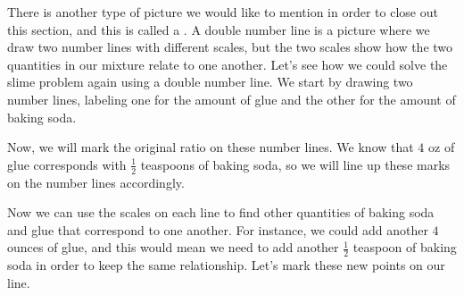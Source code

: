 \documentclass{ximera}
\begin{document}
There is another type of picture we would like to mention in order to close out this section, and this is called a . A double number line is a picture where we draw two number lines with different scales, but the two scales show how the two quantities in our mixture relate to one another. Let's see how we could solve the slime problem again using a double number line. We start by drawing two number lines, labeling one for the amount of glue and the other for the amount of baking soda.

\begin{image}
\end{image}

Now, we will mark the original ratio on these number lines. We know that $4$ oz of glue corresponds with $\frac{1}{2}$ teaspoons of baking soda, so we will line up these marks on the number lines accordingly. 

\begin{image}
\end{image}

Now we can use the scales on each line to find other quantities of baking soda and glue that correspond to one another. For instance, we could add another $4$ ounces of glue, and this would mean we need to add another $\frac{1}{2}$ teaspoon of baking soda in order to keep the same relationship. Let's mark these new points on our line.

\begin{image}
\end{image}
\end{document}
